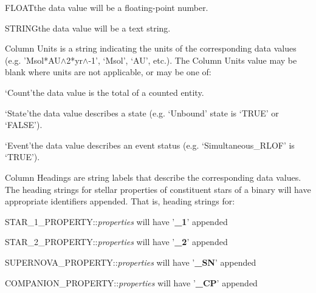 \tabto{3em}FLOAT\tabto{7.5em}the data value will be a floating-point number.

\tabto{3em}STRING\tabto{7.5em}the data value will be a text string.

\bigskip
Column Units is a string indicating the units of the corresponding data values (e.g. 'Msol*AU$\mathrm{\wedge}$2*yr$\mathrm{\wedge}$-1', `Msol', `AU', etc.).  The Column Units value may be blank where units are not applicable, or may be one of:

\tabto{3em}`Count'\tabto{7.5em}the data value is the total of a counted entity.

\tabto{3em}`State'\tabto{7.5em}the data value describes a state (e.g. `Unbound' state is `TRUE' or `FALSE').

\tabto{3em}`Event'\tabto{7.5em}the data value describes an event status (e.g. `Simultaneous\_RLOF' is `TRUE').

\bigskip
Column Headings are string labels that describe the corresponding data values. The heading strings for stellar properties of constituent stars of a binary will have appropriate identifiers appended. That is, heading strings for:

\hfill
\begin{minipage}{\dimexpr\textwidth-3em}
\medskip
STAR\_1\_PROPERTY::\textit{properties} will have '\textbf{\_1}' appended

\medskip
STAR\_2\_PROPERTY::\textit{properties} will have '\textbf{\_2}' appended

\medskip
SUPERNOVA\_PROPERTY::\textit{properties} will have '\textbf{\_SN}' appended

\medskip
COMPANION\_PROPERTY::\textit{properties} will have '\textbf{\_CP}' appended
\end{minipage}
